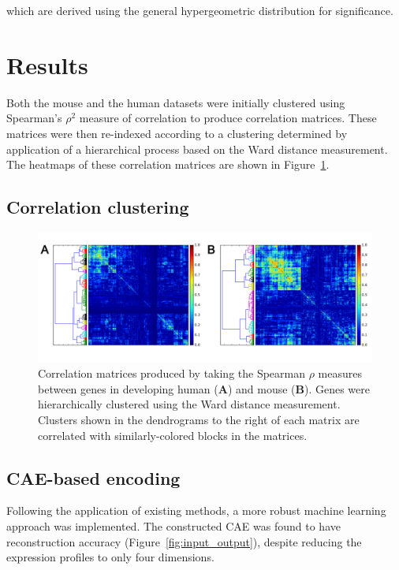 \documentclass[12pt,oneside,onecolumn,a4paper]{article}
\begin{document}
\noindent
which are derived using the general hypergeometric distribution for significance.

\section{Results}

Both the mouse and the human datasets were initially clustered using Spearman's $\rho^{2}$ measure of correlation to produce correlation matrices. These matrices were then re-indexed according to a clustering determined by application of a hierarchical process based on the Ward distance measurement. The heatmaps of these correlation matrices are shown in Figure~\ref{fig:correlations}.

\subsection{Correlation clustering}

\begin{figure}[H]
\begin{center}
\includegraphics[width=\columnwidth]{figures/pearson_spearman}
\caption{Correlation matrices produced by taking the Spearman $\rho$ measures between genes in developing human (\textbf{A}) and mouse (\textbf{B}). Genes were hierarchically clustered using the Ward distance measurement. Clusters shown in the dendrograms to the right of each matrix are correlated with similarly-colored blocks in the matrices. \label{fig:correlations}%
}
\end{center}
\end{figure}

\subsection{CAE-based encoding}

Following the application of existing methods, a more robust machine learning approach was implemented. The constructed CAE was found to have reconstruction accuracy (Figure~\ref{fig:input_output}), despite reducing the expression profiles to only four dimensions. 
\end{document}
